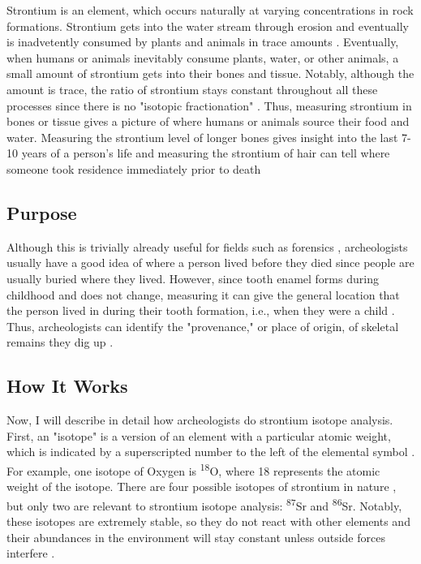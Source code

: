 \documentclass[a4paper, 12pt]{article}
\begin{document}

Strontium is an element, which occurs naturally at varying concentrations in rock formations.
Strontium gets into the water stream through erosion and eventually is inadvetently consumed by plants and animals in trace amounts \citep{bartelink2019}.
Eventually, when humans or animals inevitably consume plants, water, or other animals,
a small amount of strontium gets into their bones and tissue. Notably, although the amount is trace, the
ratio of strontium stays constant throughout all these processes since there is no "isotopic fractionation" \citep{bartelink2019}.
Thus, measuring strontium in bones or tissue gives a picture of where humans or animals source their food and water.
Measuring the strontium level of longer bones gives insight into the last 7-10
years of a person's life and measuring the strontium of hair can tell where someone
took residence immediately prior to death \citep{kamenov2014}

\subsection{Purpose}
Although this is trivially already useful for fields such as forensics \citep{kamenov2014},
archeologists usually have a good idea of where a person lived before they died
since people are usually buried where they lived. However, since tooth enamel
forms during childhood and does not change, measuring it can give the general location
that the person lived in during their tooth formation, i.e., when they were a child
\citep*{holt2021,kozieradzkaogunmakin2021,lazzerini2021}. Thus, archeologists can
identify the "provenance," or place of origin, of skeletal remains they dig up \citep{holt2021}.

\subsection{How It Works}
Now, I will describe in detail how archeologists do strontium isotope analysis.
First, an "isotope" is a version of an element with a particular atomic weight,
which is indicated by a superscripted number to the left of the elemental symbol \citep{Meave60_2015}.
For example, one isotope of Oxygen is \textsuperscript{18}O, where 18 represents
the atomic weight of the isotope. There are four possible isotopes of strontium in
nature \citep{holt2021}, but only two are relevant to strontium isotope analysis: \textsuperscript{87}Sr and \textsuperscript{86}Sr.
Notably, these isotopes are extremely stable, so they do not react with other elements
and their abundances in the environment will stay constant unless outside forces interfere \citep{Long1998}.
\end{document}
